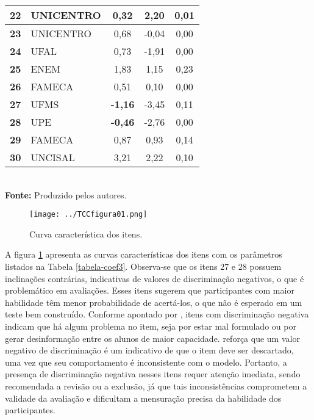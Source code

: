 \begin{table}[!htb]
\begin{tabular*}{.9\textwidth}{@{\extracolsep{\fill}}clccc@{}}
		\hline \textbf{22} & UNICENTRO & 0,32 & 2,20 & 0,01 \\ 
		\hline \textbf{23} & UNICENTRO & 0,68 & -0,04 & 0,00  \\ 
		\hline \textbf{24} & UFAL & 0,73 & -1,91 & 0,00 \\ 
		\hline \textbf{25} & ENEM & 1,83 & 1,15 & 0,23  \\ 
		\hline \textbf{26} & FAMECA & 0,51 & 0,10 & 0,00 \\ 
		\hline \textbf{27} & UFMS & \textbf{-1,16} & -3,45 & 0,11  \\ 
		\hline \textbf{28} & UPE & \textbf{-0,46} & -2,76 & 0,00  \\ 
		\hline \textbf{29} & FAMECA & 0,87 & 0,93 & 0,14  \\ 
		\hline \textbf{30} & UNCISAL & 3,21 & 2,22 & 0,10 \\ 
			\bottomrule
		\end{tabular*}\\
		\vspace*{0.5cm}
		\small{\textbf{Fonte:} Produzido pelos autores.}
\end{table}
\clearpage
\begin{figure}[H]
	\centering
	\caption{Curva característica dos itens.}
	\texttt{[image: ../TCCfigura01.png]}
	\parbox{\textwidth}{
		\centering %
	}
	\label{fig:curva_itens}
\end{figure}

A figura \ref{fig:curva_itens} apresenta as curvas características dos itens com os parâmetros listados na Tabela \ref{tabela-coef3}. Observa-se que os itens 27 e 28 possuem inclinações contrárias, indicativas de valores de discriminação negativos, o que é problemático em avaliações. Esses itens sugerem que participantes com maior habilidade têm menor probabilidade de acertá-los, o que não é esperado em um teste bem construído. Conforme apontado por , itens com discriminação negativa indicam que há algum problema no item, seja por estar mal formulado ou por gerar desinformação entre os alunos de maior capacidade.  reforça que um valor negativo de discriminação é um indicativo de que o item deve ser descartado, uma vez que seu comportamento é inconsistente com o modelo. Portanto, a presença de discriminação negativa nesses itens requer atenção imediata, sendo recomendada a revisão ou a exclusão, já que tais inconsistências comprometem a validade da avaliação e dificultam a mensuração precisa da habilidade dos participantes.


